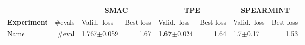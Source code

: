\documentclass[landscape]{article} %
\begin{document}
\begin{table}[t]
\begin{tabularx}{\textwidth}{lr|Xr|Xr|Xr}
\toprule
\multicolumn{2}{l}{}&\multicolumn{2}{c}{\bf SMAC}&\multicolumn{2}{c}{\bf TPE}&\multicolumn{2}{c}{\bf SPEARMINT}\\
\multicolumn{1}{l}{\bf Experiment} &\multicolumn{1}{r}{\#evals}&\multicolumn{1}{l}{Valid.\ loss} &\multicolumn{1}{r}{Best loss}&\multicolumn{1}{l}{Valid.\ loss} &\multicolumn{1}{r}{Best loss}&\multicolumn{1}{l}{Valid.\ loss} &\multicolumn{1}{r}{Best loss}\\
\toprule
Name & \#eval & 1.767$\pm$0.059 & 1.67 & \textbf{1.67}$\pm$0.024 & 1.64 & 1.7$\pm$0.17 & 1.53 \\
\bottomrule
\end{tabularx}
\end{table}
\end{document}

